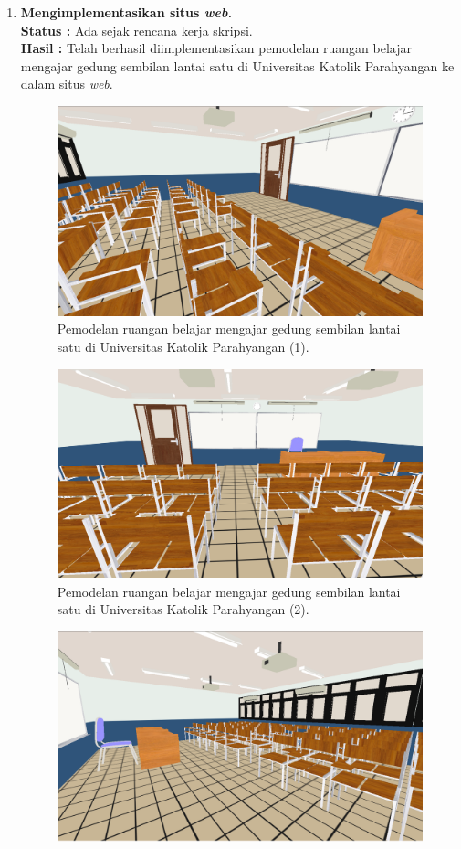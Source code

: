 \documentclass[a4paper,twoside]{article}
\begin{document}
\begin{enumerate}
		\item \textbf{Mengimplementasikan situs \textit{\textbf{web.}}}\\
		{\bf Status :} Ada sejak rencana kerja skripsi.\\
		{\bf Hasil :} Telah berhasil diimplementasikan pemodelan ruangan belajar mengajar gedung sembilan lantai satu di Universitas Katolik Parahyangan ke dalam situs {\it web}.
		\begin{figure}[H]
			\centering
			\includegraphics[scale=0.25]{kelas1}
			\caption{Pemodelan ruangan belajar mengajar gedung sembilan lantai satu di Universitas Katolik Parahyangan (1).}
		\end{figure}
		\begin{figure}[H]
			\centering
			\includegraphics[scale=0.25]{kelas2}
			\caption{Pemodelan ruangan belajar mengajar gedung sembilan lantai satu di Universitas Katolik Parahyangan (2).}
		\end{figure}
		\begin{figure}[H]
			\centering
			\includegraphics[scale=0.25]{kelas3}

\end{figure}
\end{enumerate}
\end{document}
